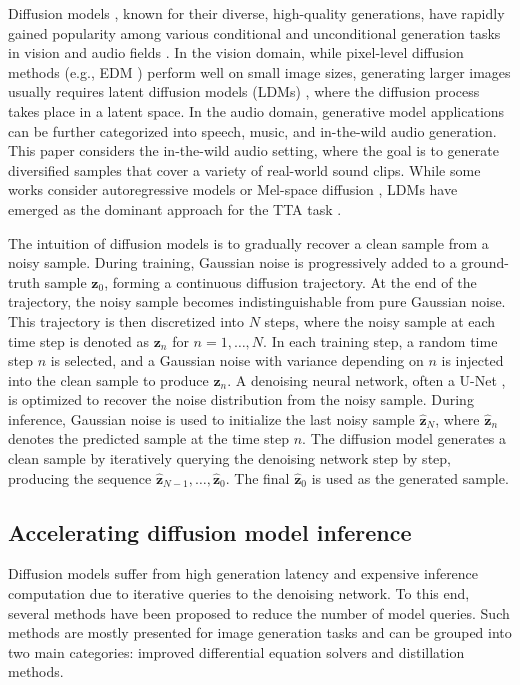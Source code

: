 \documentclass{article}
\newcommand{\sz}{\boldsymbol{z}}
\newcommand{\shatz}{\boldsymbol{\hat{z}}}
\begin{document}
Diffusion models \cite{diffusion, ddpm}, known for their diverse, high-quality generations, have rapidly gained popularity among various conditional and unconditional generation tasks in vision and audio fields \cite{sd, edm, audioldm, noise2music}. In the vision domain, while pixel-level diffusion methods (e.g., EDM \cite{edm}) perform well on small image sizes, generating larger images usually requires latent diffusion models (LDMs) \cite{ldm}, where the diffusion process takes place in a latent space. In the audio domain, generative model applications can be further categorized into speech, music, and in-the-wild audio generation. This paper considers the in-the-wild audio setting, where the goal is to generate diversified samples that cover a variety of real-world sound clips. While some works consider autoregressive models \cite{audiogen} or Mel-space diffusion \cite{riffusion}, LDMs have emerged as the dominant approach for the TTA task \cite{tango, diffsound, audioldm, audioldm-2, make-an-audio, make-an-audio-2, codi}. 

The intuition of diffusion models is to gradually recover a clean sample from a noisy sample. During training, Gaussian noise is progressively added to a ground-truth sample $\sz_0$, forming a continuous diffusion trajectory. At the end of the trajectory, the noisy sample becomes indistinguishable from pure Gaussian noise. This trajectory is then discretized into $N$ steps, where the noisy sample at each time step is denoted as $\sz_n$ for $n = 1, \ldots, N$. In each training step, a random time step $n$ is selected, and a Gaussian noise with variance depending on $n$ is injected into the clean sample to produce $\sz_n$. A denoising neural network, often a U-Net \cite{unet}, is optimized to recover the noise distribution from the noisy sample. During inference, Gaussian noise is used to initialize the last noisy sample $\shatz_{N}$, where $\shatz_{n}$ denotes the predicted sample at the time step $n$. The diffusion model generates a clean sample by iteratively querying the denoising network step by step, producing the sequence $\shatz_{N-1}, \ldots, \shatz_0$. The final $\shatz_0$ is used as the generated sample.


\subsection{Accelerating diffusion model inference}

Diffusion models suffer from high generation latency and expensive inference computation due to iterative queries to the denoising network. To this end, several methods have been proposed to reduce the number of model queries. Such methods are mostly presented for image generation tasks and can be grouped into two main categories: improved differential equation solvers and distillation methods. 
\end{document}
